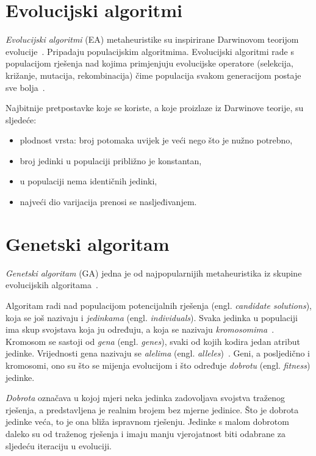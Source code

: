 \documentclass[times, utf8, seminar, numeric]{fer}
\begin{document}
\section{Evolucijski algoritmi}

\textit{Evolucijski algoritmi} (EA) metaheuristike su inspirirane Darwinovom teorijom evolucije~\cite{WikiEvolutionary}.
Pripadaju populacijskim algoritmima.
Evolucijski algoritmi rade s populacijom rješenja nad kojima primjenjuju evolucijske operatore (selekcija, križanje, mutacija, rekombinacija) čime populacija svakom generacijom postaje sve bolja~\cite{Cupic}.

Najbitnije pretpostavke koje se koriste, a koje proizlaze iz Darwinove teorije, su sljedeće:
\begin{itemize}
	\item plodnost vrsta: broj potomaka uvijek je veći nego što je nužno potrebno,
	\vspace{-1mm}
	\item broj jedinki u populaciji približno je konstantan,
	\vspace{-1mm}
	\item u populaciji nema identičnih jedinki,
	\vspace{-1mm}
	\item najveći dio varijacija prenosi se nasljeđivanjem.
\end{itemize}

\section{Genetski algoritam}

\textit{Genetski algoritam} (GA) jedna je od najpopularnijih metaheuristika iz skupine evolucijskih algoritama~\cite{WikiEvolutionary}.

Algoritam radi nad populacijom potencijalnih rješenja (engl. \textit{candidate solutions}), koja se još nazivaju i \textit{jedinkama} (engl. \textit{individuals}).
Svaka jedinka u populaciji ima skup svojstava koja ju određuju, a koja se nazivaju \textit{kromosomima}~\cite{WikiGenetic}.
Kromosom se sastoji od \textit{gena} (engl. \textit{genes}), svaki od kojih kodira jedan atribut jedinke.
Vrijednosti gena nazivaju se \textit{alelima} (engl. \textit{alleles})~\cite{Kuthan2007GeneticAI}.
Geni, a posljedično i kromosomi, ono su što se mijenja evolucijom i što određuje \textit{dobrotu} (engl. \textit{fitness}) jedinke.

\textit{Dobrota} označava u kojoj mjeri neka jedinka zadovoljava svojstva traženog rješenja, a predstavljena je realnim brojem bez mjerne jedinice.
Što je dobrota jedinke veća, to je ona bliža ispravnom rješenju. 
Jedinke s malom dobrotom daleko su od traženog rješenja i imaju manju vjerojatnost biti odabrane za sljedeću iteraciju u evoluciji.\medskip
\end{document}
